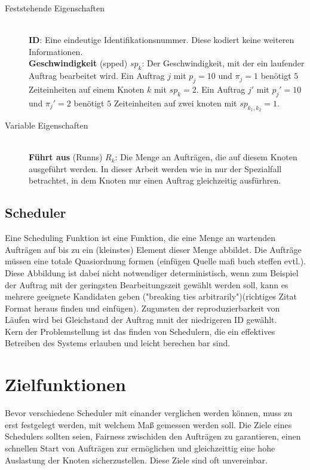 \begin{description}
	\item[Feststehende Eigenschaften] \hfil \\
	\textbf{ID}: Eine eindeutige Identifikationsnummer. Diese kodiert keine weiteren Informationen.\\
	\textbf{Geschwindigkeit} (spped) $sp_k$: Der Geschwindigkeit, mit der ein laufender Auftrag bearbeitet wird. Ein Auftrag $j$ mit $p_j = 10$ und $\pi_j = 1$ benötigt $5$ Zeiteinheiten auf einem Knoten $k$ mit $sp_k = 2$. Ein Auftrag $j'$ mit $p_j' = 10$ und $\pi_j' = 2$ benötigt $5$ Zeiteinheiten auf zwei knoten mit $sp_{k_1, k_2} = 1$.\\
	\item[Variable Eigenschaften] \hfil \\
	\textbf{Führt aus} (Runns) $R_k$: Die Menge an Aufträgen, die auf diesem Knoten ausgeführt werden. In dieser Arbeit werden wie in \cite{Arn99} nur der Spezialfall betrachtet, in dem Knoten nur einen Auftrag gleichzeitig ausfürhren.\\
\end{description}


\subsection{Scheduler}
Eine Scheduling Funktion ist eine Funktion, die eine Menge an wartenden Aufträgen auf bis zu ein (kleinstes) Element dieser Menge abbildet. Die Aufträge müssen eine totale Quasiordnung formen (einfügen Quelle mafi buch steffen evtl.). Diese Abbildung ist dabei nicht notwendiger deterministisch, wenn zum Beispiel der Auftrag mit der geringsten Bearbeitungszeit gewählt werden soll, kann es mehrere geeignete Kandidaten geben ("breaking ties arbitrarily")(richtiges Zitat Format heraus finden und einfügen)\cite{Kar97}. Zugunsten der reproduzierbarkeit von Läufen wird bei Gleichstand der Auftrag mnit der niedrigeren ID gewählt.\\
Kern der Problemstellung ist das finden von Schedulern, die ein effektives Betreiben des Systems erlauben und leicht berechen bar sind.

\section{Zielfunktionen}
Bevor verschiedene Scheduler mit einander verglichen werden können, muss zu erst festgelegt werden, mit welchem Maß gemessen werden soll. Die Ziele eines Schedulers sollten seien, Fairness zwischiden den Aufträgen zu garantieren, einen schnellen Start von Aufträgen zur ermöglichen und gleichzeittig eine hohe Auslastung der Knoten sicherzustellen. Diese Ziele sind oft unvereinbar.


